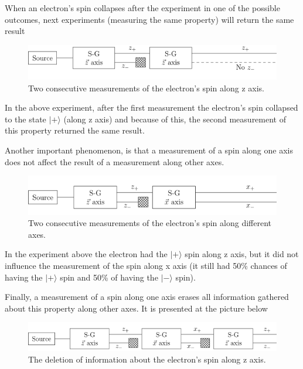 When an electron's spin collapses after the experiment in one of the possible outcomes, next experiments (measuring the same property) will return the same result

\begin{figure}[ht]
\centering
\includegraphics[scale=0.7]{stern_gerlach_consecutive_z_axis.png}
\caption{Two consecutive measurements of the electron's spin along z axis.}
\end{figure}

In the above experiment, after the first measurement the electron's spin collapsed to the state $|+\rangle$ (along z axis) and because of this, the second measurement of this property returned the same result.\newline

Another important phenomenon, is that a measurement of a spin along one axis does not affect the result of a measurement along other axes.

\begin{figure}[ht]
\centering
\includegraphics[scale=0.7]{stern_gerlach_different_axes}
\caption{Two consecutive measurements of the electron's spin along different axes.}
\end{figure}

In the experiment above the electron had the $|+\rangle$ spin along z axis, but it did not influence the measurement of the spin along x axis (it still had 50\% chances of having the $|+\rangle$ spin and 50\% of having the $|-\rangle$ spin).\newline

Finally, a measurement of a spin along one axis erases all information gathered about this property along other axes. It is presented at the picture below

\begin{figure}[ht]
\centering
\includegraphics[scale=0.7]{stern_gerlach_deletion_of_information}
\caption{The deletion of information about the electron's spin along z axis.}
\end{figure}

